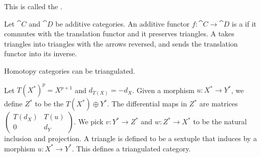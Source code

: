 \begin{definition}
\begin{enumerate}
        This is called the .
        \begin{center}
        \end{center}
    \end{enumerate}
\end{definition}
\begin{definition}
    Let $\cat{C}$ and $\cat{D}$ be additive categories. An additive functor $f:\cat{C}\to\cat{D}$ is a  if it commutes with the translation functor and it preserves triangles. A  takes triangles into triangles with the arrows reversed, and sends the translation functor into its inverse.
\end{definition}
\par
Homotopy categories can be triangulated.
\begin{proposition}
    Let $T{({X}^{*})}^{p}={X}^{p+1}$ and ${d}_{T(X)}=-{d}_{X}$. Given a morphism $u:{X}^{*}\to{Y}^{*}$, we define ${Z}^{*}$ to be the  $T({X}^{*})\oplus{Y}^{*}$. The differential maps in ${Z}^{*}$ are matrices $\begin{pmatrix}
        T({d}_{X}) & T(u) \\
        0 & {d}_{Y}
    \end{pmatrix}$. We pick $v:{Y}^{*}\to{Z}^{*}$ and $w:{Z}^{*}\to{X}^{*}$ to be the natural inclusion and projection. A triangle is defined to be a sextuple that induces by a morphism $u:{X}^{*}\to{Y}^{*}$. This defines a triangulated category.
\end{proposition}
